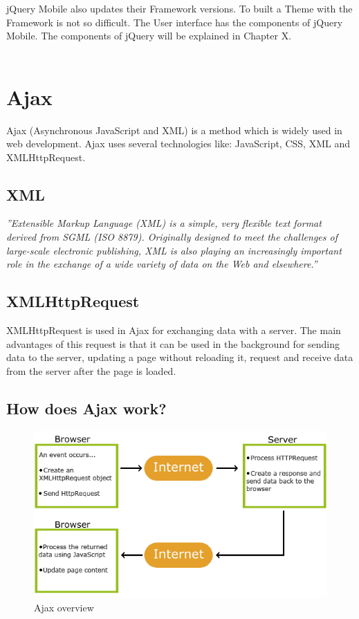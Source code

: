   jQuery Mobile  also updates their Framework versions. To built a Theme with the Framework is not so difficult. The User interface has the components of jQuery Mobile. The components of jQuery will be explained in Chapter X.\\\\
  
  \section {Ajax}
  Ajax (Asynchronous JavaScript and XML) is a method which is widely used in web development. Ajax uses several technologies like: JavaScript, CSS, XML and XMLHttpRequest.\cite{ajax}
  \\
  \subsection{XML}
  \textit{''Extensible Markup Language (XML) is a simple, very flexible text format derived from SGML (ISO 8879). Originally designed to meet the challenges of large-scale electronic publishing, XML is also playing an increasingly important role in the exchange of a wide variety of data on the Web and elsewhere.''}\cite{xml}
  \\
  \subsection{XMLHttpRequest}
  XMLHttpRequest is used in Ajax for exchanging data with a server. The main advantages of this request is that it can be used in the background for sending data to the server, updating a page without reloading it, request and receive data from the server after the page is loaded.\cite{xmlHttp} 
  \newpage
  \subsection{How does Ajax work?}
  \begin{figure}[htbp]
  \centering
  \includegraphics[width=\textwidth,height=\textheight,keepaspectratio]{graphics/ajaxwork.png}
  \caption{Ajax overview\cite{ajax}}
  \end{figure}
  
